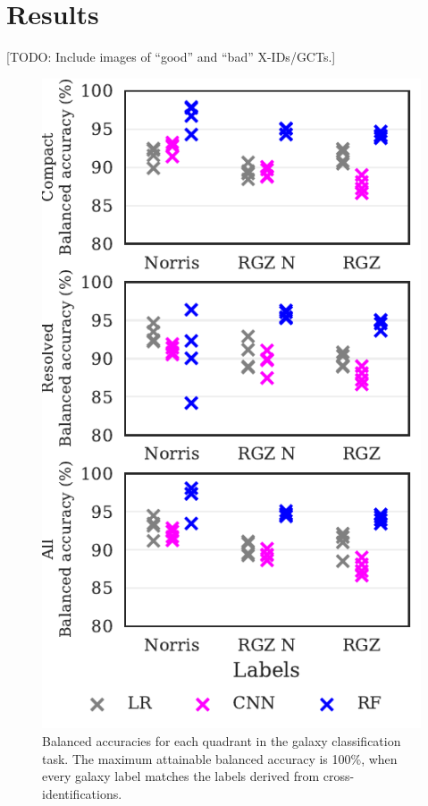 \documentclass[fleqn,usenatbib,usedcolumn]{mnras}
\begin{document}
\section{Results}\label{results}

  {[}TODO: Include images of ``good'' and ``bad'' X-IDs/GCTs.{]}

  \begin{figure}
  \centering
  \includegraphics[width=\columnwidth]{images/cdfs_ba_grid.pdf}
  \caption{Balanced accuracies for each quadrant in the galaxy
    classification task. The maximum attainable balanced accuracy
    is 100\%, when every galaxy label matches the labels derived
    from \citet{norris06} cross-identifications.\label{fig:ba}}
  \end{figure}
\end{document}

